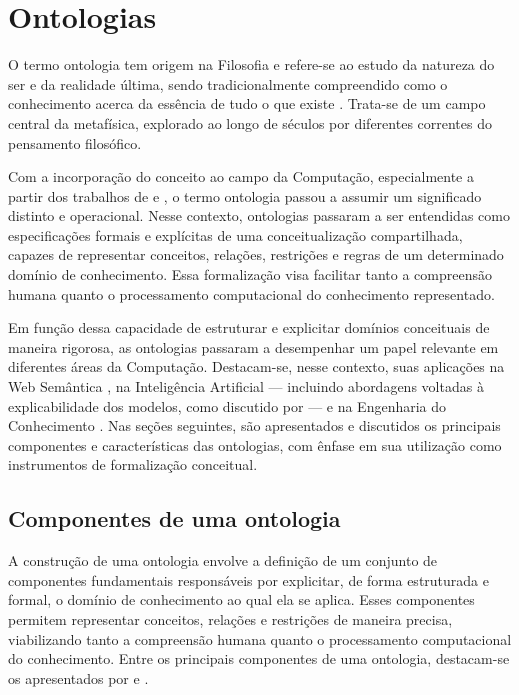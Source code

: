 \section{Ontologias}
O termo ontologia tem origem na Filosofia e refere-se ao estudo da natureza do ser e da realidade última, sendo tradicionalmente compreendido como o conhecimento acerca da essência de tudo o que existe \cite{chaui1995convite}. Trata-se de um campo central da metafísica, explorado ao longo de séculos por diferentes correntes do pensamento filosófico.

Com a incorporação do conceito ao campo da Computação, especialmente a partir dos trabalhos de \citeauthor{neches1991enabling} e \citeauthor{gruber1993translation}, o termo ontologia passou a assumir um significado distinto e operacional. Nesse contexto, ontologias passaram a ser entendidas como especificações formais e explícitas de uma conceitualização compartilhada, capazes de representar conceitos, relações, restrições e regras de um determinado domínio de conhecimento. Essa formalização visa facilitar tanto a compreensão humana quanto o processamento computacional do conhecimento representado.

Em função dessa capacidade de estruturar e explicitar domínios conceituais de maneira rigorosa, as ontologias passaram a desempenhar um papel relevante em diferentes áreas da Computação. Destacam-se, nesse contexto, suas aplicações na Web Semântica \cite{isotani2015ontologias}, na Inteligência Artificial — incluindo abordagens voltadas à explicabilidade dos modelos, como discutido por \citeauthor{confalonieri2023multiple} — e na Engenharia do Conhecimento \cite{gomez2004ontological}. Nas seções seguintes, são apresentados e discutidos os principais componentes e características das ontologias, com ênfase em sua utilização como instrumentos de formalização conceitual.

\subsection{Componentes de uma ontologia}
A construção de uma ontologia envolve a definição de um conjunto de componentes fundamentais responsáveis por explicitar, de forma estruturada e formal, o domínio de conhecimento ao qual ela se aplica. Esses componentes permitem representar conceitos, relações e restrições de maneira precisa, viabilizando tanto a compreensão humana quanto o processamento computacional do conhecimento. Entre os principais componentes de uma ontologia, destacam-se os apresentados por \citeauthor{corcho2005building}  e \citeauthor{gomez2004ontological}.

